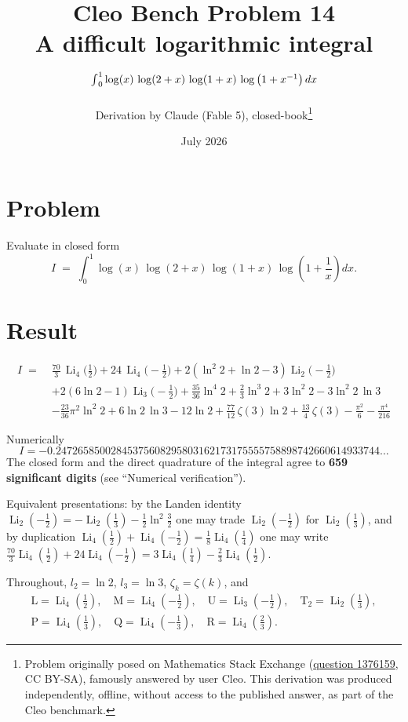 \documentclass[11pt]{article}
\title{Cleo Bench Problem 14\\[1ex]\large A difficult logarithmic integral ${\Large\int}_0^1\log(x)\,\log(2+x)\,\log(1+x)\,\log\left(1+x^{-1}\right)dx$}
\author{Derivation by Claude (Fable 5), closed-book\thanks{Problem originally
posed on Mathematics Stack Exchange
(\href{https://math.stackexchange.com/q/1376159}{question 1376159}, CC BY-SA),
famously answered by user Cleo. This derivation was produced independently,
offline, without access to the published answer, as part of the Cleo benchmark.}}
\date{July 2026}
\theoremstyle{remark}
\begin{document}
\maketitle

\section*{Problem}

Evaluate in closed form
\[
I \;=\; \int_0^1 \log(x)\,\log(2+x)\,\log(1+x)\,\log\!\left(1+\frac1x\right)dx .
\]

\section*{Result}

\[
\boxed{
\begin{aligned}
I \;=\;& \frac{70}{3}\,\operatorname{Li}_4\!\Big(\tfrac12\Big)+24\,\operatorname{Li}_4\!\Big(-\tfrac12\Big)
+2\left(\ln^2 2+\ln 2-3\right)\operatorname{Li}_2\!\Big(-\tfrac12\Big)\\[2pt]
&+2\left(6\ln 2-1\right)\operatorname{Li}_3\!\Big(-\tfrac12\Big)
+\frac{35}{36}\ln^4 2+\frac23\ln^3 2+3\ln^2 2-3\ln^2 2\,\ln 3\\[2pt]
&-\frac{23}{36}\pi^2\ln^2 2+6\ln 2\,\ln 3-12\ln 2
+\frac{77}{12}\,\zeta(3)\ln 2+\frac{13}{4}\,\zeta(3)-\frac{\pi^2}{6}-\frac{\pi^4}{216}
\end{aligned}
}
\]

Numerically
\[
I=-0.24726585002845375608295803162173175555758898742660614933744\ldots
\]
The closed form and the direct quadrature of the integral agree to \textbf{659 significant digits} (see ``Numerical verification'').

Equivalent presentations: by the Landen identity $\operatorname{Li}_2(-\tfrac12)=-\operatorname{Li}_2(\tfrac13)-\tfrac12\ln^2\tfrac32$ one may trade $\operatorname{Li}_2(-\tfrac12)$ for $\operatorname{Li}_2(\tfrac13)$, and by duplication $\operatorname{Li}_4(\tfrac12)+\operatorname{Li}_4(-\tfrac12)=\tfrac18\operatorname{Li}_4(\tfrac14)$ one may write $\frac{70}{3}\operatorname{Li}_4(\tfrac12)+24\operatorname{Li}_4(-\tfrac12) = 3\operatorname{Li}_4(\tfrac14)-\tfrac23\operatorname{Li}_4(\tfrac12)$.

Throughout, $l_2=\ln 2$, $l_3=\ln 3$, $\zeta_k=\zeta(k)$, and
\[
\begin{gathered}
\mathrm{L}=\operatorname{Li}_4(\tfrac12),\quad
\mathrm{M}=\operatorname{Li}_4(-\tfrac12),\quad
\mathrm{U}=\operatorname{Li}_3(-\tfrac12),\quad
\mathrm{T}_2=\operatorname{Li}_2(\tfrac13),\\
\mathrm{P}=\operatorname{Li}_4(\tfrac13),\quad
\mathrm{Q}=\operatorname{Li}_4(-\tfrac13),\quad
\mathrm{R}=\operatorname{Li}_4(\tfrac23).
\end{gathered}
\]
\end{document}
